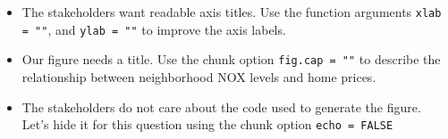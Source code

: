 \documentclass[12pt]{article}
\begin{document}
\begin{itemize}
  \item The stakeholders want readable axis titles. Use the function arguments \texttt{xlab = ""}, and \texttt{ylab = ""} to improve the axis labels.
  
  \item Our figure needs a title. Use the chunk option \texttt{fig.cap = ""} to describe the relationship between neighborhood NOX levels and home prices. 

  \item The stakeholders do not care about the code used to generate the figure. Let's hide it for this question using the chunk option \texttt{echo = FALSE}
\end{itemize}
\end{document}
